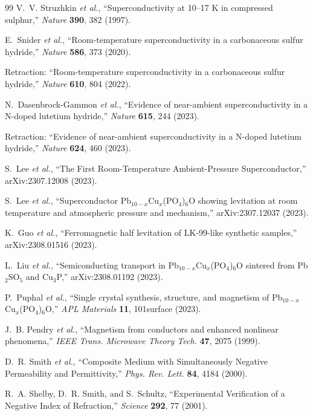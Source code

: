 \documentclass[aps,prb,twocolumn,superscriptaddress,floatfix,nofootinbib,longbibliography]{revtex4-2}
\begin{document}
\begin{thebibliography}{99}
V.~V. Struzhkin \textit{et al.}, ``Superconductivity at 10--17 K in
compressed sulphur,'' \textit{Nature} \textbf{390}, 382 (1997).

E.~Snider \textit{et al.}, ``Room-temperature superconductivity in a
carbonaceous sulfur hydride,'' \textit{Nature} \textbf{586}, 373 (2020).

Retraction: ``Room-temperature superconductivity in a carbonaceous sulfur
hydride,'' \textit{Nature} \textbf{610}, 804 (2022).

N.~Dasenbrock-Gammon \textit{et al.}, ``Evidence of near-ambient
superconductivity in a N-doped lutetium hydride,'' \textit{Nature}
\textbf{615}, 244 (2023).

Retraction: ``Evidence of near-ambient superconductivity in a N-doped
lutetium hydride,'' \textit{Nature} \textbf{624}, 460 (2023).

S.~Lee \textit{et al.}, ``The First Room-Temperature Ambient-Pressure
Superconductor,'' arXiv:2307.12008 (2023).

S.~Lee \textit{et al.}, ``Superconductor Pb$_{10-x}$Cu$_x$(PO$_4$)$_6$O
showing levitation at room temperature and atmospheric pressure and
mechanism,'' arXiv:2307.12037 (2023).

K.~Guo \textit{et al.}, ``Ferromagnetic half levitation of LK-99-like
synthetic samples,'' arXiv:2308.01516 (2023).

L.~Liu \textit{et al.}, ``Semiconducting transport in
Pb$_{10-x}$Cu$_x$(PO$_4$)$_6$O sintered from Pb$_2$SO$_5$ and Cu$_3$P,''
arXiv:2308.01192 (2023).

P.~Puphal \textit{et al.}, ``Single crystal synthesis, structure, and
magnetism of Pb$_{10-x}$Cu$_x$(PO$_4$)$_6$O,'' \textit{APL Materials}
\textbf{11}, 101surface (2023).

J.~B. Pendry \textit{et al.}, ``Magnetism from conductors and enhanced
nonlinear phenomena,'' \textit{IEEE Trans. Microwave Theory Tech.}
\textbf{47}, 2075 (1999).

D.~R. Smith \textit{et al.}, ``Composite Medium with Simultaneously
Negative Permeability and Permittivity,'' \textit{Phys. Rev. Lett.}
\textbf{84}, 4184 (2000).

R.~A. Shelby, D.~R. Smith, and S.~Schultz, ``Experimental Verification
of a Negative Index of Refraction,'' \textit{Science} \textbf{292}, 77 (2001).


\end{thebibliography}
\end{document}
